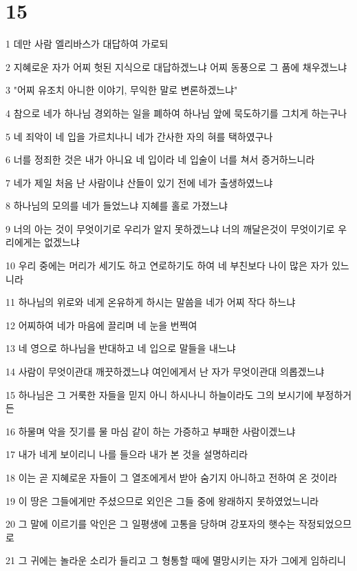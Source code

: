 \chapter{15}

\par 1 데만 사람 엘리바스가 대답하여 가로되
\par 2 지혜로운 자가 어찌 헛된 지식으로 대답하겠느냐 어찌 동풍으로 그 품에 채우겠느냐
\par 3 "어찌 유조치 아니한 이야기, 무익한 말로 변론하겠느냐"
\par 4 참으로 네가 하나님 경외하는 일을 폐하여 하나님 앞에 묵도하기를 그치게 하는구나
\par 5 네 죄악이 네 입을 가르치나니 네가 간사한 자의 혀를 택하였구나
\par 6 너를 정죄한 것은 내가 아니요 네 입이라 네 입술이 너를 쳐서 증거하느니라
\par 7 네가 제일 처음 난 사람이냐 산들이 있기 전에 네가 출생하였느냐
\par 8 하나님의 모의를 네가 들었느냐 지혜를 홀로 가졌느냐
\par 9 너의 아는 것이 무엇이기로 우리가 알지 못하겠느냐 너의 깨달은것이 무엇이기로 우리에게는 없겠느냐
\par 10 우리 중에는 머리가 세기도 하고 연로하기도 하여 네 부친보다 나이 많은 자가 있느니라
\par 11 하나님의 위로와 네게 온유하게 하시는 말씀을 네가 어찌 작다 하느냐
\par 12 어찌하여 네가 마음에 끌리며 네 눈을 번쩍여
\par 13 네 영으로 하나님을 반대하고 네 입으로 말들을 내느냐
\par 14 사람이 무엇이관대 깨끗하겠느냐 여인에게서 난 자가 무엇이관대 의롭겠느냐
\par 15 하나님은 그 거룩한 자들을 믿지 아니 하시나니 하늘이라도 그의 보시기에 부정하거든
\par 16 하물며 악을 짓기를 물 마심 같이 하는 가증하고 부패한 사람이겠느냐
\par 17 내가 네게 보이리니 나를 들으라 내가 본 것을 설명하리라
\par 18 이는 곧 지혜로운 자들이 그 열조에게서 받아 숨기지 아니하고 전하여 온 것이라
\par 19 이 땅은 그들에게만 주셨으므로 외인은 그들 중에 왕래하지 못하였었느니라
\par 20 그 말에 이르기를 악인은 그 일평생에 고통을 당하며 강포자의 햇수는 작정되었으므로
\par 21 그 귀에는 놀라운 소리가 들리고 그 형통할 때에 멸망시키는 자가 그에게 임하리니
